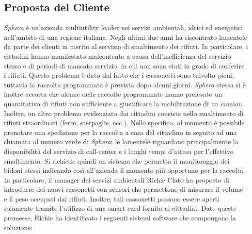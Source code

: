 \subsection{Proposta del Cliente}
\textit{Sphera} è un'azienda multiutility leader nei servizi ambientali, idrici ed energetici nell'ambito di una regione italiana.
Negli ultimi due anni ha riscontrato lamentele da parte dei clienti in merito al servizio di smaltimento dei rifiuti.
In particolare, i cittadini hanno manifestato malcontento a causa dell'inefficienza del servizio stesso e di periodi di
mancato servizio, in cui non sono stati in grado di conferire i rifiuti.
Questo problema è dato dal fatto che i cassonetti sono talvolta pieni, tuttavia la raccolta programmata è prevista dopo alcuni giorni.
\textit{Sphera} stessa si è inoltre accorta che alcune delle raccolte programmate hanno prelevato un quantitativo di rifiuti non sufficiente a giustificare la mobilitazione di un camion.
Inoltre, un altro problema evidenziato dai cittadini consiste nello smaltimento di rifiuti straordinari (ferro, sterpaglie, ecc.).
Nello specifico, al momento è possibile prenotare una spedizione per la raccolta a casa del cittadino in seguito ad una chiamata al numero verde di \textit{Sphera}: le lamentele riguardano principalmente la disponibilità del servizio di call-center e i lunghi tempi d'attesa per l'effettivo smaltimento.
Si richiede quindi un sistema che permetta il monitoraggio dei bidoni stessi indicando così all'azienda il momento più opportuno per la raccolta.
In particolare, il manager dei servizi ambientali Richie Clato ha proposto di introdurre dei nuovi cassonetti con sensori che permettono di misurare il volume e il peso occupati dai rifiuti.
Inoltre, tali cassonetti possono essere aperti solamente tramite l'utilizzo di una smart card fornita ai cittadini.
Date queste premesse, Richie ha identificato i seguenti sistemi software che compongono la soluzione:
